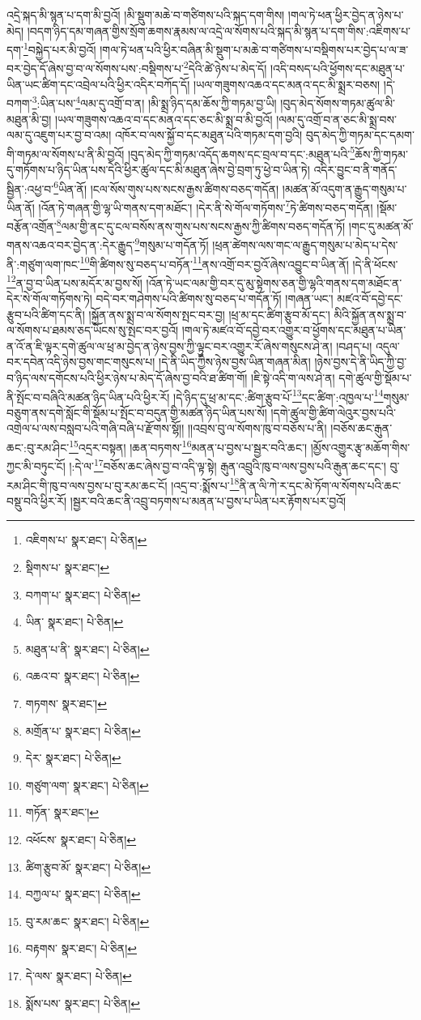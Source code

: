 འདྲེ་སྐད་མི་སྙན་པ་དག་མི་བྱའོ། །མི་སྡུག་མཆེ་བ་གཙིགས་པའི་སྐད་དག་གིས། །གལ་ཏེ་ཕན་ཕྱིར་བྱེད་ན་ཉེས་པ་མེད། །བདག་ཉིད་དམ་གཞན་གྱིས་སྲོག་ཆགས་རྣམས་ལ་འདྲེ་ལ་སོགས་པའི་སྐད་མི་སྙན་པ་དག་གིས་:འཇིགས་པ་དག་\footnote{འཇིགས་པ་  སྣར་ཐང་།  པེ་ཅིན། }བསྐྱེད་པར་མི་བྱའོ། །གལ་ཏེ་ཕན་པའི་ཕྱིར་བཞིན་མི་སྡུག་པ་མཆེ་བ་གཙིགས་པ་བསྡིགས་པར་བྱེད་པ་ལ་ཟ་བར་བྱེད་དོ་ཞེས་བྱ་བ་ལ་སོགས་པས་:བསྡིགས་པ་\footnote{སྡིགས་པ་  སྣར་ཐང་། }དེའི་ཚེ་ཉེས་པ་མེད་དོ། །འདི་བསད་པའི་ཕྱོགས་དང་མཐུན་པ་ཡིན་ཡང་ཚིག་དང་འབྲེལ་པའི་ཕྱིར་འདིར་བཀོད་དོ། །ཡལ་གཟུགས་འཆའ་དང་མནའ་དང་མི་སྨྲར་བཅས། །དེ་བཀག་\footnote{བཀག་པ་  སྣར་ཐང་།  པེ་ཅིན། }:ཡིན་པས་\footnote{ཡིན་  སྣར་ཐང་།  པེ་ཅིན། }ལམ་དུ་འགྲོ་བ་ན། །མི་སྨྲ་ཉིད་དམ་ཆོས་ཀྱི་གཏམ་བྱ་ཡི། །བུད་མེད་སོགས་གཏམ་ཚུལ་མི་མཐུན་མི་བྱ། །ཡལ་གཟུགས་འཆའ་བ་དང་མནའ་དང་ཅང་མི་སྨྲ་བ་མི་བྱའོ། །ལམ་དུ་འགྲོ་བ་ན་ཅང་མི་སྨྲ་བས་ལམ་དུ་འཇུག་པར་བྱ་བ་འམ། འཁོར་བ་ལས་སྐྱོ་བ་དང་མཐུན་པའི་གཏམ་དག་བྱའི། བུད་མེད་ཀྱི་གཏམ་དང་དམག་གི་གཏམ་ལ་སོགས་པ་ནི་མི་བྱའོ། །བུད་མེད་ཀྱི་གཏམ་འདོད་ཆགས་དང་བྲལ་བ་དང་:མཐུན་པའི་\footnote{མཐུན་པ་ནི་  སྣར་ཐང་།  པེ་ཅིན། }ཆོས་ཀྱི་གཏམ་དུ་གཏོགས་པ་ཉིད་ཡིན་པས་དེའི་ཕྱིར་ཚུལ་དང་མི་མཐུན་ཞེས་བྱེ་བྲག་ཏུ་ཕྱེ་བ་ཡིན་ཏེ། འདིར་བྱུང་བ་ནི་གནོད་སྦྱིན་:འཕྱ་བ་\footnote{འཆའ་བ་  སྣར་ཐང་།  པེ་ཅིན། }ཡིན་ནོ། །ངལ་སོས་གུས་པས་སངས་རྒྱས་ཚིགས་བཅད་གདོན། །མཚན་མོ་འདུག་ན་རྒྱུད་གསུམ་པ་ཡིན་ནོ། །འོན་ཏེ་གཞན་གྱི་ལྷ་ཡི་གནས་དག་མཐོང་། །དེར་ནི་སེ་གོལ་གཏོགས་\footnote{གཏགས་  སྣར་ཐང་། }ཏེ་ཚིགས་བཅད་གདོན། །སྡོམ་བརྩོན་འགྲོན་\footnote{མགྲོན་པ་  སྣར་ཐང་།  པེ་ཅིན། }ལམ་གྱི་ནང་དུ་ངལ་བསོས་ནས་གུས་པས་སངས་རྒྱས་ཀྱི་ཚིགས་བཅད་གདོན་ཏོ། །གང་དུ་མཚན་མོ་གནས་འཆའ་བར་བྱེད་ན་:དེར་རྒྱུད་\footnote{དེར་  སྣར་ཐང་།  པེ་ཅིན། }གསུམ་པ་གདོན་ཏོ། །ཕྲན་ཚེགས་ལས་གང་ལ་རྒྱུད་གསུམ་པ་མེད་པ་དེས་ནི་:གཙུག་ལག་ཁང་\footnote{གཙུག་ལག་  སྣར་ཐང་།  པེ་ཅིན། }གི་ཚིགས་སུ་བཅད་པ་བཏོན་\footnote{གཏོན་  སྣར་ཐང་། }ནས་འགྲོ་བར་བྱའོ་ཞེས་འབྱུང་བ་ཡིན་ནོ། །དེ་ནི་ཕོངས་\footnote{འཕོངས་  སྣར་ཐང་།  པེ་ཅིན། }ན་བྱ་བ་ཡིན་པས་མདོར་མ་བྱས་སོ། །འོན་ཏེ་ཡང་ལམ་གྱི་བར་དུ་མུ་སྟེགས་ཅན་གྱི་ལྷའི་གནས་དག་མཐོང་ན་དེར་སེ་གོལ་གཏོགས་ཏེ། བདེ་བར་གཤེགས་པའི་ཚིགས་སུ་བཅད་པ་གདོན་ཏོ། །གཞན་ཡང་། མཛའ་བོ་དབྱེ་དང་རྩུབ་པའི་ཚིག་དང་ནི། །སྐྱོན་ནས་སྨྲ་བ་ལ་སོགས་སྤང་བར་བྱ། །ཕྲ་མ་དང་ཚིག་རྩུབ་མོ་དང་། མིའི་སྐྱོན་ནས་སྨྲ་བ་ལ་སོགས་པ་ཐམས་ཅད་ཡོངས་སུ་སྤང་བར་བྱའོ། །གལ་ཏེ་མཛའ་བོ་དབྱེ་བར་འགྱུར་བ་ཕྱོགས་དང་མཐུན་པ་ཡིན་ན་འོ་ན་ཇི་ལྟར་དགེ་ཚུལ་ལ་ཕྲ་མ་བྱེད་ན་ཉེས་བྱས་ཀྱི་ལྟུང་བར་འགྱུར་རོ་ཞེས་གསུངས་ཤེ་ན། །བཤད་པ། འདུལ་བར་དབེན་འདི་ཉེས་བྱས་གང་གསུངས་པ། །དེ་ནི་ཡིད་ཀྱིས་ཉེས་བྱས་ཡིན་གཞན་མིན། །ཉེས་བྱས་དེ་ནི་ཡིད་ཀྱི་བྱ་བ་ཉིད་ལས་དགོངས་པའི་ཕྱིར་ཉེས་པ་མེད་དོ་ཞེས་བྱ་བའི་ཐ་ཚིག་གོ། །ཇི་སྟེ་འདི་ག་ལས་ཤེ་ན། དགེ་ཚུལ་གྱི་སྡོམ་པ་ནི་སྤོང་བ་བཞིའི་མཚན་ཉིད་ཡིན་པའི་ཕྱིར་རོ། །དེ་ཉིད་དུ་ཕྲ་མ་དང་:ཚིག་རྩུབ་པོ་\footnote{ཚིག་རྩུབ་མོ་  སྣར་ཐང་།  པེ་ཅིན། }དང་ཚིག་:འཁྱལ་པ་\footnote{བཀྱལ་པ་  སྣར་ཐང་།  པེ་ཅིན། }གསུམ་བཅུག་ནས་དགེ་སློང་གི་སྡོམ་པ་སྤོང་བ་བདུན་གྱི་མཚན་ཉིད་ཡིན་པས་སོ། །དགེ་ཚུལ་གྱི་ཚིག་ལེའུར་བྱས་པའི་འགྲེལ་པ་ལས་བསླབ་པའི་གཞི་བཞི་པ་རྫོགས་སྷོ།། །།འབྲས་བུ་ལ་སོགས་ཁུ་བ་བཅོས་པ་ནི། །བཅོས་ཆང་རྒུན་ཆང་:བུ་རམ་ཤིང་\footnote{བུ་རམ་ཆང་  སྣར་ཐང་།  པེ་ཅིན། }འདྲར་བསྟན། །ཆན་བཏགས་\footnote{བརྟགས་  སྣར་ཐང་།  པེ་ཅིན། }མནན་པ་བྱས་པ་སྦྱར་བའི་ཆང་། །མྱོས་འགྱུར་རྩྭ་མཆོག་གིས་ཀྱང་མི་བཏུང་ངོ། །:དེ་ལ་\footnote{དེ་ལས་  སྣར་ཐང་།  པེ་ཅིན། }བཅོས་ཆང་ཞེས་བྱ་བ་འདི་ལྟ་སྟེ། རྒུན་འབྲུའི་ཁུ་བ་ལས་བྱས་པའི་རྒུན་ཆང་དང་། བུ་རམ་ཤིང་གི་ཁུ་བ་ལས་བྱས་པ་བུ་རམ་ཆང་ངོ། །འདྲ་བ་:སྨོས་པ་\footnote{སྨོས་པས་  སྣར་ཐང་།  པེ་ཅིན། }ནི་ན་ལི་ཀེ་ར་དང་མེ་ཏོག་ལ་སོགས་པའི་ཆང་བསྡུ་བའི་ཕྱིར་རོ། །སྦྱར་བའི་ཆང་ནི་འབྲུ་བཏགས་པ་མནན་པ་བྱས་པ་ཡིན་པར་རྟོགས་པར་བྱའོ། 